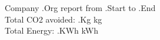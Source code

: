 \documentclass{article}
\begin{document}
Company {{.Org}} report from {{.Start}} to {{.End}}\\
Total CO2 avoided: {{.Kg}} kg\\
Total Energy: {{.KWh}} kWh
\end{document}
